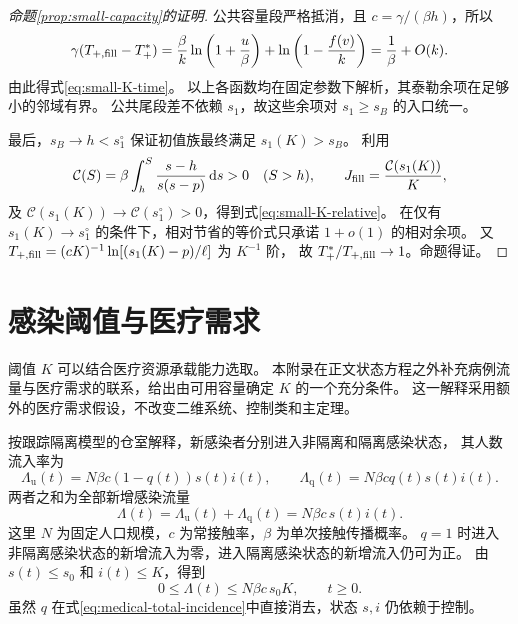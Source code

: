 \documentclass[11pt,a4paper,UTF8]{ctexart}
\theoremstyle{definition}
\newcommand{\dd}{\,\mathrm d}
\begin{document}
\begin{proof}[命题\ref{prop:small-capacity}的证明]
公共容量段严格抵消，且 $c=\gamma/(\beta h)$，所以
\begin{equation}
 \gamma(T_{+,\rm fill}-T_+^*)
 =\frac\beta k\ln\left(1+\frac u\beta\right)
   +\ln\left(1-\frac{f(v)}k\right)
 =\frac1\beta+O(k).
 \label{eq:small-K-time-series}
\end{equation}
由此得式\eqref{eq:small-K-time}。
以上各函数均在固定参数下解析，其泰勒余项在足够小的邻域有界。
公共尾段差不依赖 $s_1$，故这些余项对 $s_1\ge s_B$ 的入口统一。

最后，$s_B\to h<s_1^\circ$ 保证初值族最终满足 $s_1(K)>s_B$。
利用
\[
 \mathcal C(S)=\beta\int_h^S\frac{s-h}{s(s-p)}\dd s>0\quad(S>h),
 \qquad J_{\rm fill}=\frac{\mathcal C(s_1(K))}K,
\]
及 $\mathcal C(s_1(K))\to\mathcal C(s_1^\circ)>0$，得到式\eqref{eq:small-K-relative}。
在仅有 $s_1(K)\to s_1^\circ$ 的条件下，相对节省的等价式只承诺 $1+o(1)$ 的相对余项。
又 $T_{+,\rm fill}=(cK)^{-1}\ln[(s_1(K)-p)/\ell]$ 为 $K^{-1}$ 阶，
故 $T_+^*/T_{+,\rm fill}\to1$。命题得证。
\end{proof}

\section{感染阈值与医疗需求}
\label{app:medical-capacity}

阈值 $K$ 可以结合医疗资源承载能力选取。
本附录在正文状态方程之外补充病例流量与医疗需求的联系，给出由可用容量确定 $K$ 的一个充分条件。
这一解释采用额外的医疗需求假设，不改变二维系统、控制类和主定理。

按跟踪隔离模型的仓室解释\citep{Zhou2024SPCI}，新感染者分别进入非隔离和隔离感染状态，
其人数流入率为
\[
\Lambda_{\mathrm u}(t)=N\beta c(1-q(t))s(t)i(t),\qquad
\Lambda_{\mathrm q}(t)=N\beta cq(t)s(t)i(t).
\]
两者之和为全部新增感染流量
\begin{equation}
\Lambda(t)=\Lambda_{\mathrm u}(t)+\Lambda_{\mathrm q}(t)
=N\beta c\,s(t)i(t).
\label{eq:medical-total-incidence}
\end{equation}
这里 $N$ 为固定人口规模，$c$ 为常接触率，$\beta$ 为单次接触传播概率。
$q=1$ 时进入非隔离感染状态的新增流入为零，进入隔离感染状态的新增流入仍可为正。
由 $s(t)\le s_0$ 和 $i(t)\le K$，得到
\begin{equation}
0\le\Lambda(t)\le N\beta c\,s_0K,\qquad t\ge0.
\label{eq:medical-incidence-bound}
\end{equation}
虽然 $q$ 在式\eqref{eq:medical-total-incidence}中直接消去，状态 $s,i$ 仍依赖于控制。
\end{document}

